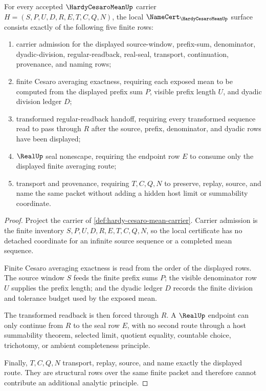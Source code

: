 \begin{theorem}\label{thm:hardy-cesaro-mean-namecert-obligations}
For every accepted $\HardyCesaroMeanUp$ carrier $H=(S,P,U,D,R,E,T,C,Q,N)$, the local $\NameCert_{\HardyCesaroMeanUp}$ surface consists exactly of the following five finite rows:
\begin{enumerate}
\item carrier admission for the displayed source-window, prefix-sum, denominator, dyadic-division, regular-readback, real-seal, transport, continuation, provenance, and naming rows;
\item finite Cesaro averaging exactness, requiring each exposed mean to be computed from the displayed prefix sum $P$, visible prefix length $U$, and dyadic division ledger $D$;
\item transformed regular-readback handoff, requiring every transformed sequence read to pass through $R$ after the source, prefix, denominator, and dyadic rows have been displayed;
\item $\RealUp$ seal nonescape, requiring the endpoint row $E$ to consume only the displayed finite averaging route;
\item transport and provenance, requiring $T,C,Q,N$ to preserve, replay, source, and name the same packet without adding a hidden host limit or summability coordinate.
\end{enumerate}
\end{theorem}
\begin{proof}
Project the carrier of \autoref{def:hardy-cesaro-mean-carrier}. Carrier admission is the finite inventory $S,P,U,D,R,E,T,C,Q,N$, so the local certificate has no detached coordinate for an infinite source sequence or a completed mean sequence.

Finite Cesaro averaging exactness is read from the order of the displayed rows. The source window $S$ feeds the finite prefix sums $P$; the visible denominator row $U$ supplies the prefix length; and the dyadic ledger $D$ records the finite division and tolerance budget used by the exposed mean.

The transformed readback is then forced through $R$. A $\RealUp$ endpoint can only continue from $R$ to the seal row $E$, with no second route through a host summability theorem, selected limit, quotient equality, countable choice, trichotomy, or ambient completeness principle.

Finally, $T,C,Q,N$ transport, replay, source, and name exactly the displayed route. They are structural rows over the same finite packet and therefore cannot contribute an additional analytic principle.
\end{proof}

